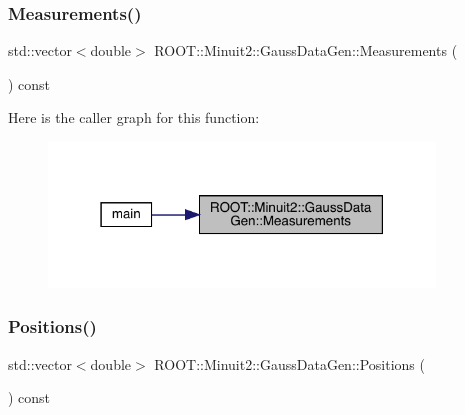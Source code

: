 \subsubsection{\texorpdfstring{Measurements()}{Measurements()}}
{\footnotesize\ttfamily std\+::vector$<$double$>$ R\+O\+O\+T\+::\+Minuit2\+::\+Gauss\+Data\+Gen\+::\+Measurements (\begin{DoxyParamCaption}{ }\end{DoxyParamCaption}) const\hspace{0.3cm}{\ttfamily [inline]}}

Here is the caller graph for this function\+:\nopagebreak
\begin{figure}[H]
\begin{center}
\leavevmode
\includegraphics[width=291pt]{d8/d75/classROOT_1_1Minuit2_1_1GaussDataGen_aa943fffb99444ab2b72198f36b906f71_icgraph}
\end{center}
\end{figure}
\mbox{\label{classROOT_1_1Minuit2_1_1GaussDataGen_a1f8db2c19b438ac1665045a5737c1d62}} 
\subsubsection{\texorpdfstring{Positions()}{Positions()}}
{\footnotesize\ttfamily std\+::vector$<$double$>$ R\+O\+O\+T\+::\+Minuit2\+::\+Gauss\+Data\+Gen\+::\+Positions (\begin{DoxyParamCaption}{ }\end{DoxyParamCaption}) const\hspace{0.3cm}{\ttfamily [inline]}}

